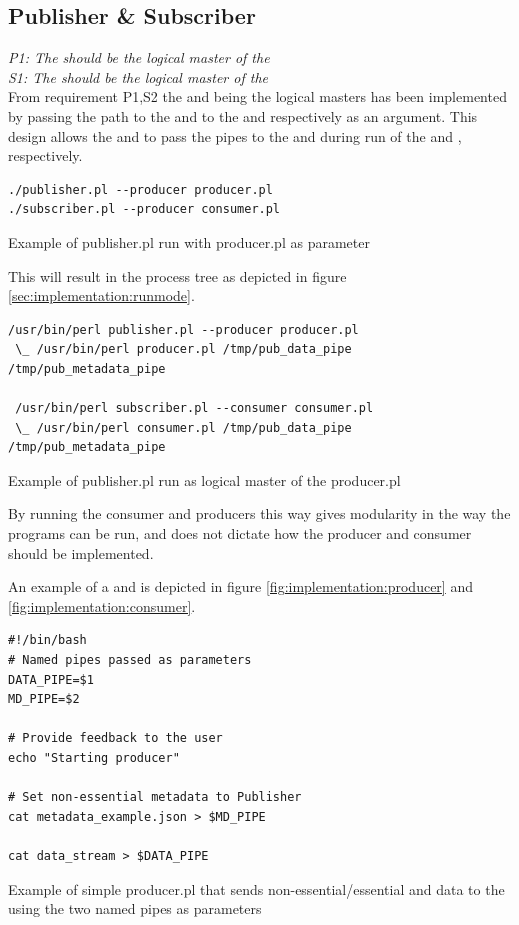 \subsection{Publisher \& Subscriber}

\textit{P1: The \pub{} should be the logical master of the \pro{}}\\
\textit{S1: The \sub{} should be the logical master of the \pro{}}\\

From requirement P1,S2 the \pub{} and \sub{} being the logical masters has been implemented by passing the path to the \con{} and \pro{} to the \sub{} and \pro{} respectively as an argument. This design allows the \pub{} and \sub{} to pass the pipes to the \pro{} and \con{} during run of the \con{} and \pro{}, respectively.

\begin{listing}[H] 
\begin{verbatim}
./publisher.pl --producer producer.pl
./subscriber.pl --producer consumer.pl
\end{verbatim}
\caption{Example of publisher.pl run with producer.pl as parameter}
\label{code:critical_section_c}
\end{listing}

This will result in the process tree as depicted in figure \ref{sec:implementation:runmode}.

\begin{listing}[H] 
\begin{verbatim}
/usr/bin/perl publisher.pl --producer producer.pl
 \_ /usr/bin/perl producer.pl /tmp/pub_data_pipe /tmp/pub_metadata_pipe
 
 /usr/bin/perl subscriber.pl --consumer consumer.pl
 \_ /usr/bin/perl consumer.pl /tmp/pub_data_pipe /tmp/pub_metadata_pipe
\end{verbatim}
\caption{Example of publisher.pl run as logical master of the producer.pl}
\label{sec:implementation:runmode}
\end{listing}

By running the consumer and producers this way gives modularity in the way the programs can be run, and does not dictate how the producer and consumer should be implemented.

An example of a \pro{} and \con{} is depicted in figure \ref{fig:implementation:producer} and \ref{fig:implementation:consumer}.

\begin{listing}[H] 
\begin{verbatim}
#!/bin/bash
# Named pipes passed as parameters
DATA_PIPE=$1
MD_PIPE=$2

# Provide feedback to the user
echo "Starting producer"

# Set non-essential metadata to Publisher
cat metadata_example.json > $MD_PIPE

cat data_stream > $DATA_PIPE
\end{verbatim}
\caption{Example of simple producer.pl that sends non-essential/essential and data to the \pub{} using the two named pipes as parameters}
\label{sec:implementation:producer_example}
\end{listing}


